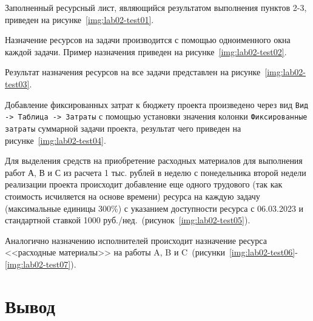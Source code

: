 Заполненный ресурсный лист, являющийся результатом выполнения пунктов 2-3,
приведен на рисунке~\ref{img:lab02-test01}.


Назначение ресурсов на задачи производится с помощью одноименного окна каждой
задачи. Пример назначения приведен на рисунке~\ref{img:lab02-test02}.


Результат назначения ресурсов на все задачи представлен на
рисунке~\ref{img:lab02-test03}.


Добавление фиксированных затрат к бюджету проекта произведено через вид
\texttt{Вид -> Таблица -> Затраты} с помощью установки значения колонки
\texttt{Фиксированные затраты} суммарной задачи проекта, результат чего
приведен на рисунке~\ref{img:lab02-test04}.


Для выделения средств на приобретение расходных материалов для выполнения работ
А, В и С из расчета 1 тыс. рублей в неделю с понедельника второй недели
реализации проекта происходит добавление еще одного трудового (так как
стоимость исчиляется на основе времени) ресурса на каждую задачу (максимальные
единицы 300\%) с указанием доступности ресурса с 06.03.2023 и стандартной
ставкой 1000 руб./нед.~(рисунок~\ref{img:lab02-test05}).


Аналогично назначению исполнителей происходит назначение ресурса <<расходные
материалы>> на работы A, B и
C~(рисунки~\ref{img:lab02-test06}-\ref{img:lab02-test07}).




\section*{Вывод}

